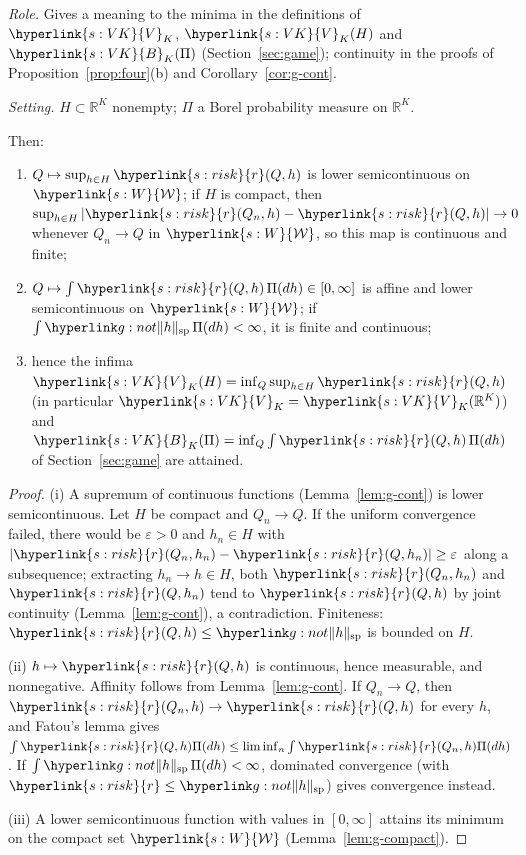 \documentclass[11pt]{article}
\DeclareRobustCommand{\sy}[2]{{\hyperlink{#1}{#2}}}
\newcommand{\R}{\mathbb{R}}
\newcommand{\1}{\mathbf{1}}
\newcommand{\Wc}{\sy{s:W}{\mathcal W}}
\newcommand{\rk}{\sy{s:risk}{r}}
\newcommand{\VK}{\sy{s:VK}{V}}
\newcommand{\BK}{\sy{s:VK}{B}}
\begin{document}
\begin{lemma}\label{lem:g-min}
\textit{Role.} Gives a meaning to the minima in the definitions of $\VK_K$, $\VK_K(H)$ and $\BK_K(\Pi)$ (Section~\ref{sec:game}); continuity in the proofs of
Proposition~\ref{prop:four}(b) and Corollary~\ref{cor:g-cont}.

\noindent\textit{Setting.} $H\subset\R^K$ nonempty; $\Pi$ a Borel probability measure on $\R^K$.

\noindent Then:
\begin{enumerate}
\item[(i)] $Q\mapsto\sup_{h\in H}\rk(Q,h)$ is lower semicontinuous on $\Wc$; if $H$ is compact, then $\sup_{h\in H}|\rk(Q_n,h)-\rk(Q,h)|\to0$ whenever $Q_n\to Q$ in $\Wc$, so
this map is continuous and finite;
\item[(ii)] $Q\mapsto\int\rk(Q,h)\,\Pi(dh)\in[0,\infty]$ is affine and lower semicontinuous on $\Wc$; if $\int\gsp h\,\Pi(dh)<\infty$, it is finite and continuous;
\item[(iii)] hence the infima $\VK_K(H)=\inf_Q\sup_{h\in H}\rk(Q,h)$ (in particular $\VK_K=\VK_K(\R^K)$) and $\BK_K(\Pi)=\inf_Q\int\rk(Q,h)\,\Pi(dh)$ of Section~\ref{sec:game} are attained.
\end{enumerate}
\end{lemma}
\begin{proof}
(i) A supremum of continuous functions (Lemma~\ref{lem:g-cont}) is lower semicontinuous. Let $H$ be compact and $Q_n\to Q$. If the uniform convergence failed, there would be
$\varepsilon>0$ and $h_n\in H$ with $|\rk(Q_n,h_n)-\rk(Q,h_n)|\ge\varepsilon$ along a subsequence; extracting $h_n\to h\in H$, both $\rk(Q_n,h_n)$ and $\rk(Q,h_n)$ tend to
$\rk(Q,h)$ by joint continuity (Lemma~\ref{lem:g-cont}), a contradiction. Finiteness: $\rk(Q,h)\le\gsp h$ is bounded on $H$.

(ii) $h\mapsto\rk(Q,h)$ is continuous, hence measurable, and nonnegative. Affinity follows from Lemma~\ref{lem:g-cont}. If $Q_n\to Q$, then $\rk(Q_n,h)\to\rk(Q,h)$ for every
$h$, and Fatou's lemma gives $\int\rk(Q,h)\Pi(dh)\le\liminf_n\int\rk(Q_n,h)\Pi(dh)$. If $\int\gsp h\,\Pi(dh)<\infty$, dominated convergence (with $\rk\le\gsp h$) gives
convergence instead.

(iii) A lower semicontinuous function with values in $[0,\infty]$ attains its minimum on the compact set $\Wc$ (Lemma~\ref{lem:g-compact}).
\end{proof}
\end{document}
